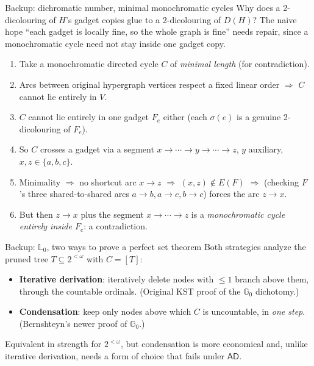 \documentclass[aspectratio=169]{beamer}
\begin{document}
\begin{frame}{Backup: dichromatic number, minimal monochromatic cycles}
  Why does a 2-dicolouring of $H$'s gadget copies glue to a 2-dicolouring of $D(H)$? The naive hope ``each gadget is locally fine, so the whole graph is fine'' needs repair, since a monochromatic cycle need \alert{not} stay inside one gadget copy.
  \begin{enumerate}
    \item Take a monochromatic directed cycle $C$ of \emph{minimal length} (for contradiction).
    \item Arcs between original hypergraph vertices respect a fixed linear order $\Rightarrow$ $C$ cannot lie entirely in $V$.
    \item $C$ cannot lie entirely in one gadget $F_e$ either (each $\sigma(e)$ is a genuine 2-dicolouring of $F_e$).
    \item So $C$ crosses a gadget via a segment $x\to\cdots\to y\to\cdots\to z$, $y$ auxiliary, $x,z\in\{a,b,c\}$.
    \item Minimality $\Rightarrow$ no shortcut arc $x\to z$ $\Rightarrow$ $(x,z)\notin E(F)$ $\Rightarrow$ (checking $F$'s three shared-to-shared arcs $a\to b, a\to c, b\to c$) forces the arc $z\to x$.
    \item But then $z\to x$ plus the segment $x\to\cdots\to z$ is a \emph{monochromatic cycle entirely inside $F_e$}: a contradiction.
  \end{enumerate}
\end{frame}

\begin{frame}{Backup: $\mathbb L_0$, two ways to prove a perfect set theorem}
  Both strategies analyze the pruned tree $T\subseteq 2^{<\omega}$ with $C=[T]$:
  \begin{itemize}
    \item \textbf{Iterative derivation}: iteratively delete nodes with $\leq 1$ branch above them, through the countable ordinals. (Original KST proof of the $\mathbb G_0$ dichotomy.)
    \item \textbf{Condensation}: keep only nodes above which $C$ is uncountable, in \emph{one step}. (Bernshteyn's newer proof of $\mathbb G_0$.)
  \end{itemize}
  Equivalent in strength for $2^{<\omega}$, but condensation is more economical and, unlike iterative derivation, needs a form of choice that fails under $\mathsf{AD}$.
\end{frame}
\end{document}
